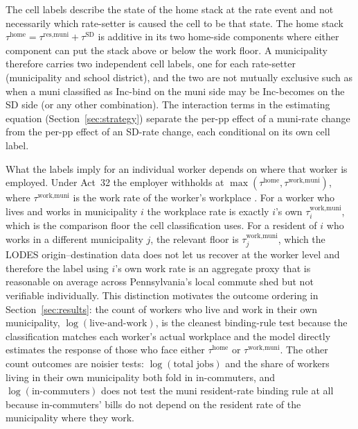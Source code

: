 \documentclass[12pt]{article}
\begin{document}
The cell labels describe the state of the home stack at the
rate event and not necessarily which rate-setter is caused the cell to be that state.
The home stack $\tau^{\text{home}} = \tau^{\text{res,muni}} + \tau^{\text{SD}}$ is
additive in its two home-side components where either component can put
the stack above or below the work floor. A municipality
therefore carries two independent cell labels, one for each
rate-setter (municipality and school district), and the two are not mutually exclusive such as when a muni
classified as Inc-bind on the muni side may be Inc-becomes on the
SD side (or any other combination). The interaction terms in the
estimating equation (Section~\ref{sec:strategy}) separate the
per-pp effect of a muni-rate change from the per-pp effect of an
SD-rate change, each conditional on its own cell label.

What the labels imply for an individual worker depends on where
that worker is employed. Under Act~32 the employer withholds at
$\max(\tau^{\text{home}}, \tau^{\text{work,muni}})$, where
$\tau^{\text{work,muni}}$ is the work rate of the
worker's workplace \citep{paAct32_2008, bagchiEffectsIntroducingWithholding2022}. For a worker who lives and works in
municipality $i$ the workplace rate is exactly $i$'s
own $\tau^{\text{work,muni}}_i$, which is the comparison floor the cell
classification uses. For a resident of $i$ who works in a different
municipality $j$, the relevant floor is $\tau^{\text{work,muni}}_j$,
which the LODES origin--destination data does not let us recover at
the worker level and therefore the label using $i$'s own
work rate is an aggregate proxy that is reasonable on
average across Pennsylvania's local commute shed but not verifiable
individually. This distinction motivates the outcome ordering in
Section~\ref{sec:results}: the count of workers who live and work
in their own municipality, $\log(\text{live-and-work})$, is the
cleanest binding-rule test because the classification matches each
worker's actual workplace and the model directly estimates the response of those who face either $\tau^{\text{home}}$ or $\tau^{\text{work,muni}}$. The other count outcomes are noisier tests: $\log(\text{total jobs})$ and the share of workers living in their own municipality both fold in in-commuters, and $\log(\text{in-commuters})$
does not test the muni resident-rate binding rule at all because
in-commuters' bills do not depend on the resident rate of the
municipality where they work.
\end{document}
